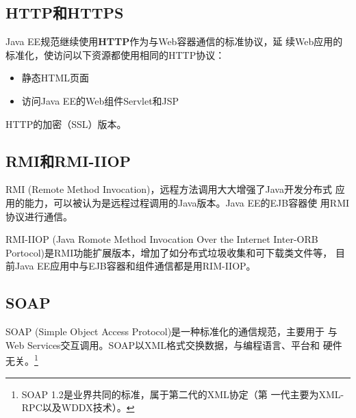 \subsection{HTTP和HTTPS} 


Java EE规范继续使用{\bf\Red HTTP}作为与Web容器通信的标准协议，延
续Web应用的标准化，使访问以下资源都使用相同的HTTP协议：

\begin{itemize}\kai
\item 静态HTML页面
\item 访问Java EE的Web组件Servlet和JSP
\end{itemize}


HTTP的加密（SSL）版本。


\subsection{RMI和RMI-IIOP} 


RMI (Remote Method Invocation)，远程方法调用大大增强了Java开发分布式
应用的能力，可以被认为是远程过程调用的Java版本。Java EE的EJB容器使
用RMI协议进行通信。


RMI-IIOP (Java Romote Method Invocation Over the Internet Inter-ORB
Portocol)是RMI功能扩展版本，增加了如分布式垃圾收集和可下载类文件等，
目前Java EE应用中与EJB容器和组件通信都是用RIM-IIOP。

\subsection{SOAP} 

SOAP (Simple Object Access Protocol)是一种标准化的通信规范，主要用于
与Web Services交互调用。SOAP以XML格式交换数据，与编程语言、平台和
硬件无关。\footnote{SOAP 1.2是业界共同的标准，属于第二代的XML协定（第
  一代主要为XML-RPC以及WDDX技术）。}
